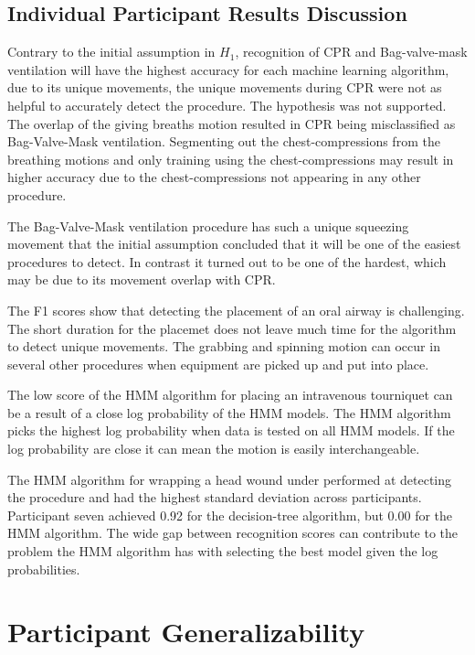 \subsection{Individual Participant Results Discussion}
\label{sec:Results:Individual:Discussion}
Contrary to the initial assumption in $H_1$, recognition of CPR and Bag-valve-mask ventilation will have the highest accuracy for each machine learning algorithm, due to its unique movements, the unique movements during CPR were not as helpful to accurately detect the procedure. The hypothesis was not supported. The overlap of the giving breaths motion resulted in CPR being misclassified as Bag-Valve-Mask ventilation. Segmenting out the chest-compressions from the breathing motions and only training using the chest-compressions may result in higher accuracy due to the chest-compressions not appearing in any other procedure.
\par The Bag-Valve-Mask ventilation procedure has such a unique squeezing movement that the initial assumption concluded that it will be one of the easiest procedures to detect. In contrast it turned out to be one of the hardest, which may be due to its movement overlap with CPR.
\par The F1 scores show that detecting the placement of an oral airway is challenging. The short duration for the placemet does not leave much time for the algorithm to detect unique movements. The grabbing and spinning motion can occur in several other procedures when equipment are picked up and put into place.
\par The low score of the HMM algorithm for placing an intravenous tourniquet can be a result of a close log probability of the HMM models. The HMM algorithm picks the highest log probability when data is tested on all HMM models. If the log probability are close it can mean the motion is easily interchangeable.
\par The HMM algorithm for wrapping a head wound under performed at detecting the procedure and had the highest standard deviation across participants. Participant seven achieved 0.92 for the decision-tree algorithm, but 0.00 for the HMM algorithm. The wide gap between recognition scores can contribute to the problem the HMM algorithm has with selecting the best model given the log probabilities.

\section{Participant Generalizability}
\label{sec:Results:Generalizability}

